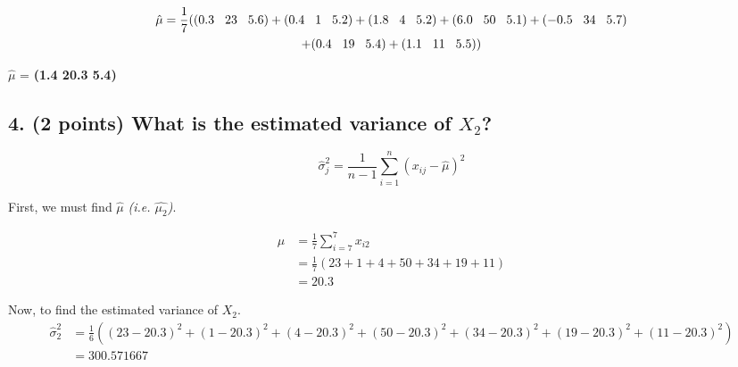 \documentclass[11pt]{article}
\begin{document}
\begin{multline*}
    \hat{\mu} = \frac{1}{7} ( 
        (0.3 \hspace{.3cm} 23 \hspace{.3cm} 5.6)
        + (0.4 \hspace{.3cm} 1 \hspace{.3cm} 5.2)
        + (1.8 \hspace{.3cm} 4 \hspace{.3cm} 5.2)
        + (6.0 \hspace{.3cm} 50 \hspace{.3cm} 5.1)
        + (-0.5 \hspace{.3cm} 34 \hspace{.3cm} 5.7) \\
        + (0.4 \hspace{.3cm} 19 \hspace{.3cm} 5.4)
        + (1.1 \hspace{.3cm} 11 \hspace{.3cm} 5.5) )
\end{multline*}

\begin{tcolorbox}[title=Problem 2.3]
    $\hat{\mu}$ = \textbf{(1.4 \hspace{.2cm} 20.3 \hspace{.2cm} 5.4)}
\end{tcolorbox}

\subsection*{\textbf{4. (2 points)} What is the estimated variance of $X_2$?}

$$\hat{\sigma}^{2}_{j} = \frac{1}{n-1}\sum_{i=1}^{n} (x_{ij} - \hat{\mu})^{2}$$

First, we must find $\hat{\mu}$ \textit{(i.e. $\hat{\mu_2}$)}.

\begin{align*}
    \hat{\mu} & = \frac{1}{7} \sum_{i=7}^{7} x_{i2} \\
    & = \frac{1}{7}(23 + 1 + 4 + 50 + 34 + 19 + 11) \\
    & = 20.3
\end{align*}

Now, to find the estimated variance of $X_2$.
\begin{align*}
    \hat{\sigma}^{2}_{2} &= \frac{1}{6}( (23 - 20.3)^2 + (1 - 20.3)^2 + (4 - 20.3)^2 + (50 - 20.3)^2 + (34 - 20.3)^2 + (19 - 20.3)^2 + (11 - 20.3)^2) \\
    &= 300.571667
\end{align*}
\end{document}
